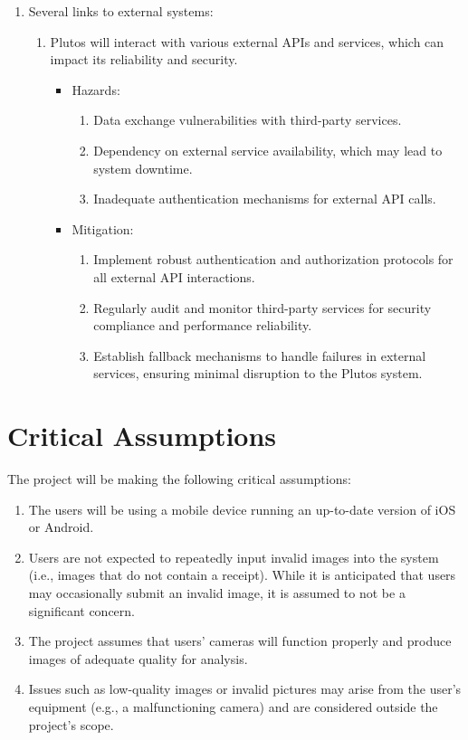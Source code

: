 \documentclass{article}
\begin{document}
\begin{enumerate}
    \item Several links to external systems:
    \begin{enumerate}
        \item Plutos will interact with various external APIs and services, which can 
        impact its reliability and security. 
		\begin{itemize}
			\item Hazards:
				\begin{enumerate}
					\item Data exchange vulnerabilities with third-party services.
                    \item Dependency on external service availability, which may lead to system downtime.
                    \item Inadequate authentication mechanisms for external API calls.
				\end{enumerate}
			\item Mitigation:
				\begin{enumerate}
					\item Implement robust authentication and authorization protocols for all external API interactions.
                    \item Regularly audit and monitor third-party services for security compliance and performance reliability.
                    \item Establish fallback mechanisms to handle failures in external services, ensuring minimal disruption 
                    to the Plutos system.
                \end{enumerate}
        \end{itemize}
    \end{enumerate}
\end{enumerate}


\section{Critical Assumptions}

The project will be making the following critical assumptions: 
\begin{enumerate}
    \item The users will be
    using a mobile device running an up-to-date version of iOS or Android.
    \item Users are
    not expected to repeatedly input invalid images into the system (i.e., images
    that do not contain a receipt). While it is anticipated that users may
    occasionally submit an invalid image, it is assumed to not be a significant
    concern.
    \item The project assumes that users' cameras will function properly and produce 
    images of adequate quality for analysis.
    \item Issues such as low-quality images or invalid pictures may arise from the 
    user's equipment (e.g., a malfunctioning camera) and are considered outside the 
    project's scope.
\end{enumerate}  
\end{document}
